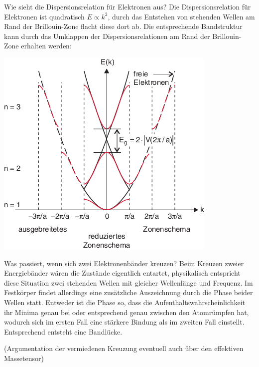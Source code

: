 \begin{fquestion}{Wie sieht die Dispersionsrelation für Elektronen aus?}
    Die Dispersionsrelation für Elektronen ist quadratisch $E \propto k^2$, durch das Entstehen von stehenden Wellen am Rand der Brillouin-Zone flacht diese dort ab. 
    Die entsprechende Bandstruktur kann durch das Umklappen der Dispersionsrelationen am Rand der Brillouin-Zone erhalten werden:
    \begin{center}
        \includegraphics[width=0.7\linewidth]{img/32672_5_De_13_Fig13_HTML.png}
    \end{center}
    
\end{fquestion}
    
\begin{fquestion}{Was passiert, wenn sich zwei Elektronenbänder kreuzen?} 
    Beim Kreuzen zweier Energiebänder wären die Zustände eigentlich entartet, physikalisch entspricht diese Situation zwei stehenden Wellen mit gleicher Wellenlänge und Frequenz.
    Im Festkörper findet allerdings eine zusätzliche Auszeichnung durch die Phase beider Wellen statt.
    Entweder ist die Phase so, dass die Aufenthaltswahrscheinlichkeit ihr Minima genau bei oder entsprechend genau zwischen den Atomrümpfen hat, wodurch sich im ersten Fall eine stärkere Bindung als im zweiten Fall einstellt.
    Entsprechend entsteht eine Bandlücke.
    
    (Argumentation der vermiedenen Kreuzung eventuell auch über den effektiven Massetensor)
\end{fquestion}

